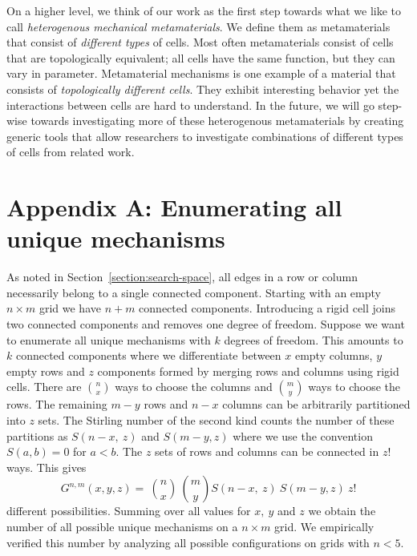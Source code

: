 On a higher level, we think of our work as the first step towards what we like to call \textit{heterogenous mechanical metamaterials}. We define them as metamaterials that consist of \textit{different types} of cells. Most often metamaterials consist of cells that are topologically equivalent; all cells have the same function, but they can vary in parameter. Metamaterial mechanisms is one example of a material that consists of \textit{topologically different cells}. They exhibit interesting behavior yet the interactions between cells are hard to understand. In the future, we will go step-wise towards investigating more of these heterogenous metamaterials by creating generic tools that allow researchers to investigate combinations of different types of cells from related work. 


\section{Appendix A: Enumerating all unique mechanisms}
\label{appendix:unique-mechanisms}

As noted in Section~\ref{section:search-space}, all edges in a row or column necessarily belong to a single connected component. Starting with an empty $n \times m$ grid we have $n+m$ connected components. Introducing a rigid cell joins two connected components and removes one degree of freedom. Suppose we want to enumerate all unique mechanisms with $k$ degrees of freedom. This amounts to $k$ connected components where we differentiate between $x$ empty columns, $y$ empty rows and $z$ components formed by merging rows and columns using rigid cells. There are $\binom{n}{x}$ ways to choose the columns and $\binom{m}{y}$ ways to choose the rows. The remaining $m-y$ rows and $n-x$ columns can be arbitrarily partitioned into $z$ sets. The Stirling number of the second kind counts the number of these partitions as $S(n-x,\ z)$ and $S(m-y,z)$ where we use the convention $S\left(a,b\right)=0$ for $a<b$. The $z$ sets of rows and columns can be connected in $z!$ ways. This gives 
$$G^{n,m}\left(x,y,z\right)=\ \binom{n}{x}\ \binom{m}{y}S\left(n-x,\ z\right)\ S\left(m-y,z\right)\ z!$$
different possibilities. Summing over all values for $x,\ y$ and $z$ we obtain the number of all possible unique mechanisms on a $n \times m$ grid. We empirically verified this number by analyzing all possible configurations on grids with $n<5$.

\pagebreak


